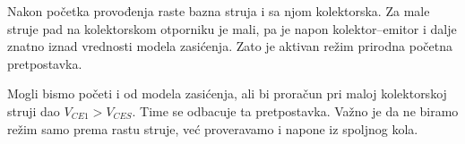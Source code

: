 Nakon početka provođenja raste bazna struja i sa njom kolektorska. Za male struje pad na kolektorskom otporniku je mali, pa je napon kolektor–emitor i dalje znatno iznad vrednosti modela zasićenja. Zato je aktivan režim prirodna početna pretpostavka.

Mogli bismo početi i od modela zasićenja, ali bi proračun pri maloj kolektorskoj struji dao $V_{CE1}>V_{CES}$. Time se odbacuje ta pretpostavka. Važno je da ne biramo režim samo prema rastu struje, već proveravamo i napone iz spoljnog kola.
